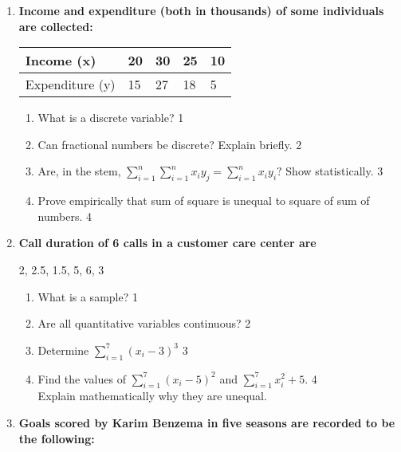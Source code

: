 \documentclass[a4paper,oneside]{book}
\begin{document}
\begin{enumerate}
  \item
  \textbf{Income and expenditure (both in thousands) of some individuals are collected:}
 

\begin{table}[h]
 \begin{center}
\begin{tabular}{l|l|l|l|l}

Income (x)  & 20 & 30 & 25 & 10 \\ \hline
Expenditure (y) & 15  & 27  & 18 & 5 \\ 
\end{tabular}
\end{center}
\end{table}


  \begin{enumerate}
    \item
	What is a discrete variable? \hfill 1
    \item
    	Can fractional numbers be discrete? Explain briefly.  \hfill 2
    \item
    	Are, in the stem, $\displaystyle \sum_{i=1}^{n} \sum_{i=1}^{n} x_iy_j = \sum_{i=1}^{n} x_iy_i?$ Show statistically. \hfill 3
     \item
     	Prove empirically that sum of square is unequal to square of sum of numbers. \hfill 4
  \end{enumerate}
  
   \item
  \textbf{Call duration of 6 calls in a customer care center are}
  
  \begin{center}
  2, 2.5, 1.5, 5, 6, 3
  \end{center}
 
  \begin{enumerate}
    \item
	What is a sample? \hfill 1
    \item
    	Are all quantitative variables continuous?  \hfill 2
    \item
    	Determine $\displaystyle \sum_{i=1}^7 (x_i-3)^3$ \hfill 3
     \item
     	Find the values of  $\displaystyle \sum_{i=1}^7 (x_i-5)^2$ and $\displaystyle \sum_{i=1}^7 x_i^2+5.$  \hfill 4 \\
     	Explain mathematically why they are unequal.
  \end{enumerate}
  
   \item
	  \textbf{Goals scored by Karim Benzema in five seasons are recorded to be the following:} 
	  

\end{enumerate}
\end{document}

